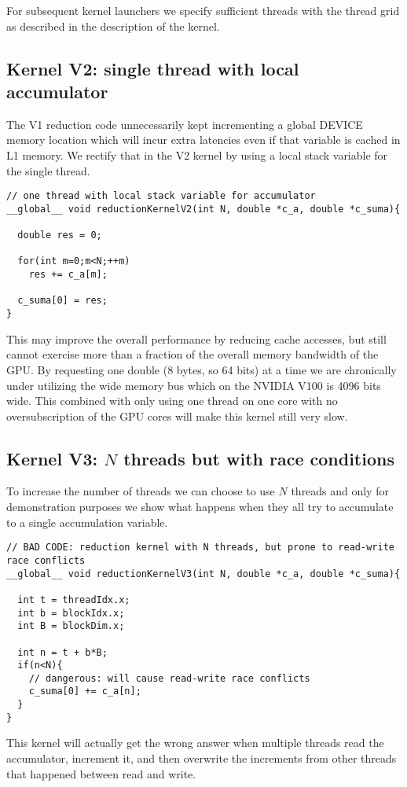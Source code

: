 For subsequent kernel launchers we specify sufficient threads with the thread grid as described in the description of the kernel. 

\subsection{Kernel  V2: single thread with local accumulator}

The V1 reduction code unnecessarily kept incrementing a global DEVICE memory location which will incur extra latencies even if that variable is cached in L1 memory. We rectify that in the V2 kernel by using a local stack variable for the single thread.

\begin{verbatim}
// one thread with local stack variable for accumulator
__global__ void reductionKernelV2(int N, double *c_a, double *c_suma){

  double res = 0;

  for(int m=0;m<N;++m)
    res += c_a[m];

  c_suma[0] = res;
}
\end{verbatim}
This may improve the overall performance by reducing cache accesses, but still cannot exercise more than a fraction of the overall memory bandwidth of the GPU. By requesting one double (8 bytes, so 64 bits) at a time we are chronically under utilizing the wide memory bus which on the NVIDIA V100 is 4096 bits wide. This combined with only using one thread on one core with no oversubscription of the GPU cores will make this kernel still very slow.

\subsection{Kernel  V3: $N$ threads but with race conditions}

To increase the number of threads we can choose to use $N$ threads and only for demonstration purposes we show what happens when they all try to accumulate to a single accumulation variable.

\begin{verbatim}
// BAD CODE: reduction kernel with N threads, but prone to read-write race conflicts                      
__global__ void reductionKernelV3(int N, double *c_a, double *c_suma){

  int t = threadIdx.x;
  int b = blockIdx.x;
  int B = blockDim.x;

  int n = t + b*B;
  if(n<N){
    // dangerous: will cause read-write race conflicts  
    c_suma[0] += c_a[n];
  }
}
\end{verbatim}
This kernel will actually get the wrong answer when multiple threads read the accumulator, increment it, and then overwrite the increments from other threads that happened between read and write.

